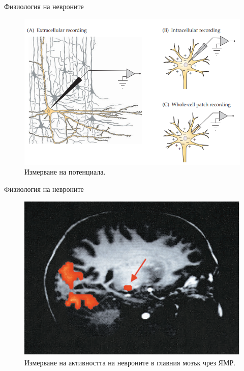 \begin{frame}[t]{Физиология на невроните}
  \begin{figure}[htbp!]
    \centering
    \includegraphics[width=\textwidth,height=0.7\textheight,keepaspectratio]{img/activation/electrical-recording.PNG}
    \caption{Измерване на потенциала. \cite[Фиг 1.7]{Neuron}}
  \end{figure}
\end{frame}

\begin{frame}[t]{Физиология на невроните}
  \begin{figure}[htbp!]
    \centering
    \includegraphics[width=\textwidth,height=0.7\textheight,keepaspectratio]{img/activation/mri-recording.PNG}
    \caption{Измерване на активността на невроните в главния мозък чрез ЯМР. \cite[Фиг 1.9]{Neuron}}
  \end{figure}
\end{frame}

